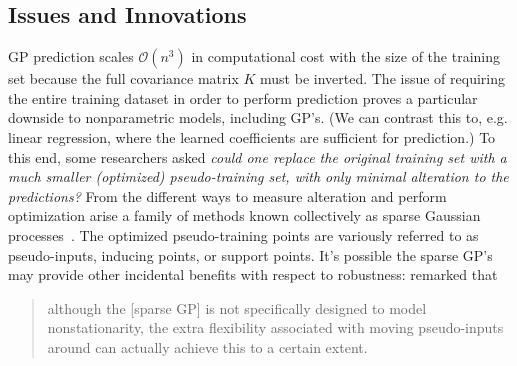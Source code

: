\subsection{Issues and Innovations}
GP prediction scales $\mathcal{O}(n^3)$ in computational cost with the size of the training set because the full covariance matrix $K$ must be inverted.  The issue of requiring the entire training dataset in order to perform prediction proves a particular downside to nonparametric models, including GP's.  (We can contrast this to, e.g. linear regression, where the learned coefficients are sufficient for prediction.)  To this end, some researchers asked \emph{could one replace the original training set with a much smaller (optimized) pseudo-training set, with only minimal alteration to the predictions?}  From the different ways to measure alteration and perform optimization arise a family of methods known collectively as sparse Gaussian processes~\cite{Qui05}.   The optimized pseudo-training points are variously referred to as pseudo-inputs, inducing points, or support points.  It's possible the sparse GP's may provide other incidental benefits with respect to robustness: \cite{Sne05} remarked that \begin{quote} although the [sparse GP] is not specifically designed to model nonstationarity, the extra flexibility associated with moving pseudo-inputs around can actually achieve this to a certain extent. \end{quote}


